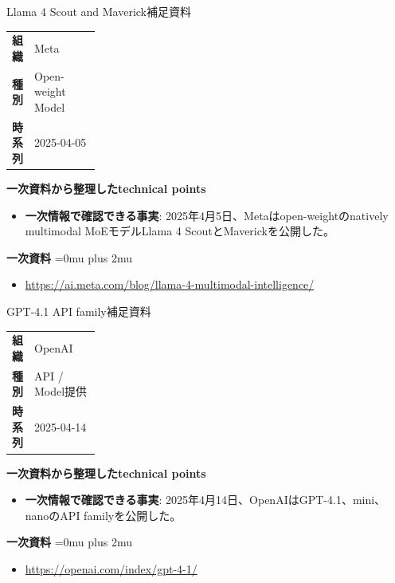 \begin{technicalnote}{Llama 4 Scout and Maverick}{補足資料}
\begingroup
\begin{tabularx}{\linewidth}{@{}>{\bfseries}p{0.22\linewidth}X@{}}
組織 & Meta \\
種別 & Open-weight Model \\
時系列 & 2025-04-05 \\
\end{tabularx}
\smallskip
\begin{minipage}{\linewidth}
{\bfseries 一次資料から整理したtechnical points}
\begin{itemize}[leftmargin=1.5em,itemsep=0.35em]
\item \textbf{一次情報で確認できる事実}: 2025年4月5日、Metaはopen-weightのnatively multimodal MoEモデルLlama 4 ScoutとMaverickを公開した。
\end{itemize}
\begin{samepage}
{\bfseries 一次資料}
\begingroup\sloppy
\Urlmuskip=0mu plus 2mu\relax
\begin{itemize}[leftmargin=1.5em,itemsep=0.25em]
\item {\scriptsize\url{https://ai.meta.com/blog/llama-4-multimodal-intelligence/}}
\end{itemize}
\endgroup
\end{samepage}
\end{minipage}
\endgroup
\end{technicalnote}
\medskip

\begin{technicalnote}{GPT-4.1 API family}{補足資料}
\begingroup
\begin{tabularx}{\linewidth}{@{}>{\bfseries}p{0.22\linewidth}X@{}}
組織 & OpenAI \\
種別 & API / Model提供 \\
時系列 & 2025-04-14 \\
\end{tabularx}
\smallskip
\begin{minipage}{\linewidth}
{\bfseries 一次資料から整理したtechnical points}
\begin{itemize}[leftmargin=1.5em,itemsep=0.35em]
\item \textbf{一次情報で確認できる事実}: 2025年4月14日、OpenAIはGPT-4.1、mini、nanoのAPI familyを公開した。
\end{itemize}
\begin{samepage}
{\bfseries 一次資料}
\begingroup\sloppy
\Urlmuskip=0mu plus 2mu\relax
\begin{itemize}[leftmargin=1.5em,itemsep=0.25em]
\item {\scriptsize\url{https://openai.com/index/gpt-4-1/}}
\end{itemize}
\endgroup
\end{samepage}
\end{minipage}
\endgroup
\end{technicalnote}
\medskip

